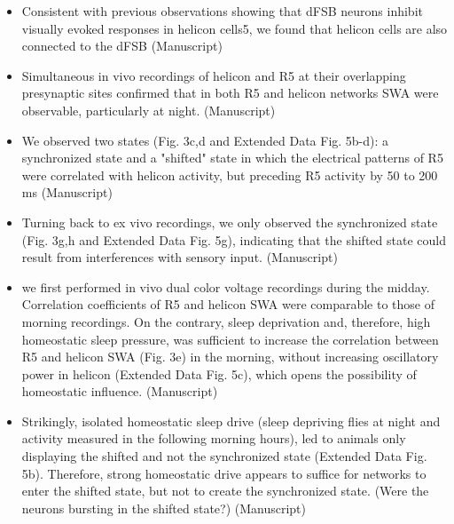 \documentclass[11pt]{article}
\begin{document}
\begin{itemize}
    \item Consistent with previous
    observations showing that dFSB neurons inhibit visually evoked responses in helicon cells5, we
    found that helicon cells are also connected to the dFSB
    \parencite{raccugliaCoherentMultilevelNetwork2022} (Manuscript)

    \item Simultaneous in vivo recordings of helicon and R5
    at their overlapping presynaptic sites confirmed that in both R5 and helicon networks SWA
    were observable, particularly at night.
    \parencite{raccugliaCoherentMultilevelNetwork2022} (Manuscript)

    \item We observed two states (Fig. 3c,d and Extended Data Fig. 5b-d): a synchronized state and a
    "shifted" state in which the electrical patterns of R5 were correlated with helicon activity, but
    preceding R5 activity by 50 to 200 ms
    \parencite{raccugliaCoherentMultilevelNetwork2022} (Manuscript)

    \item Turning back to ex vivo recordings, we only observed the synchronized state (Fig. 3g,h and
    Extended Data Fig. 5g), indicating that the shifted state could result from interferences with
    sensory input.
    \parencite{raccugliaCoherentMultilevelNetwork2022} (Manuscript)

    \item we first performed in vivo dual color
    voltage recordings during the midday. Correlation coefficients of R5 and helicon SWA were
    comparable to those of morning recordings. On the contrary, sleep deprivation and,
    therefore, high homeostatic sleep pressure, was sufficient to increase the correlation between
    R5 and helicon SWA (Fig. 3e) in the morning, without increasing oscillatory power in helicon
    (Extended Data Fig. 5c), which opens the possibility of homeostatic influence.
    \parencite{raccugliaCoherentMultilevelNetwork2022} (Manuscript)

    \item Strikingly,
    isolated homeostatic sleep drive (sleep depriving flies at night and activity measured in the
    following morning hours), led to animals only displaying the shifted and not the synchronized
    state (Extended Data Fig. 5b). Therefore, strong homeostatic drive appears to suffice for
    networks to enter the shifted state, but not to create the synchronized state.
    (Were the neurons bursting in the shifted state?)
    \parencite{raccugliaCoherentMultilevelNetwork2022} (Manuscript)


\end{itemize}
\end{document}
